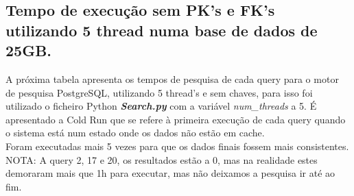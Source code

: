 \documentclass{article}
\begin{document}
\clearpage
\subsection{Tempo de execução sem PK's e FK's utilizando 5 thread numa base de dados de 25GB.}
\quad A próxima tabela apresenta os tempos de pesquisa de cada query para o motor de pesquisa PostgreSQL, utilizando 5 thread's e sem chaves, para isso foi utilizado o ficheiro Python \textbf{\textit{Search.py}}  com a variável \textit{num\_threads} a 5. 
\quad É apresentado a Cold Run que se refere à primeira execução de cada query quando o sistema está num estado onde os dados não estão em cache.\\
Foram executadas mais 5 vezes para que os dados finais fossem mais consistentes.\\
NOTA: A query 2, 17 e 20, os resultados estão a 0, mas na realidade estes demoraram mais que 1h para executar, mas não deixamos a pesquisa ir até ao fim.
\end{document}
